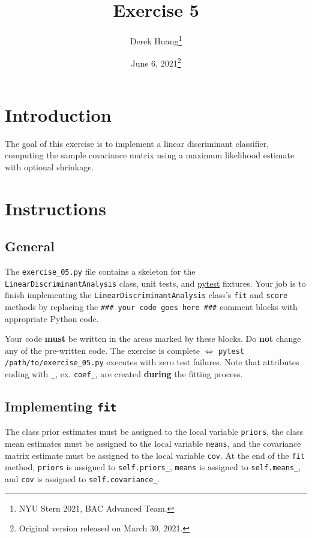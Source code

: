 \documentclass{article}
\title{Exercise 5}
\author{Derek Huang\thanks{NYU Stern 2021, BAC Advanced Team.}}
\date{June 6, 2021\thanks{Original version released on March 30, 2021.}}
\numberwithin{equation}{section}
\newcommand{\pytest}{\href{https://docs.pytest.org/en/stable/}{pytest}}
\begin{document}
\maketitle
\thispagestyle{fancy}


\section{Introduction}

The goal of this exercise is to implement a linear discriminant classifier,
computing the sample covariance matrix using a maximum likelihood estimate
with optional shrinkage.

\section{Instructions}

\subsection{General}

The \texttt{exercise\_05.py} file contains a skeleton for the
\texttt{LinearDiscriminantAnalysis} class, unit tests, and \pytest{} fixtures.
Your job is to finish implementing the \texttt{LinearDiscriminantAnalysis}
class's \texttt{fit} and \texttt{score} methods by replacing the
\texttt{\#\#\# your code goes here \#\#\#} comment blocks with appropriate
Python code.

\medskip

Your code \textbf{must} be written in the areas marked by these blocks. Do
\textbf{not} change any of the pre-written code. The exercise is complete
$ \Leftrightarrow $ \texttt{pytest /path/to/exercise\_05.py} executes with
zero test failures. Note that attributes ending with \texttt{\_}, ex.
\texttt{coef\_}, are created \textbf{during} the fitting process.

\subsection{Implementing \texttt{fit}}

The class prior estimates must be assigned to the local variable
\texttt{priors}, the class mean estimates must be assigned to the local
variable \texttt{means}, and the covariance matrix estimate must be assigned
to the local variable \texttt{cov}. At the end of the \texttt{fit} method,
\texttt{priors} is assigned to \texttt{self.priors\_}, \texttt{means} is
assigned to \texttt{self.means\_}, and \texttt{cov} is assigned to
\texttt{self.covariance\_}.
\end{document}
